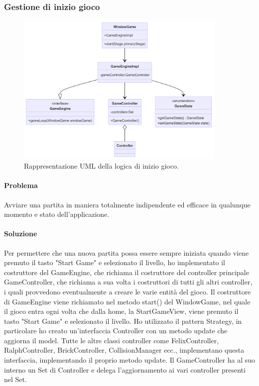 \documentclass[a4paper,12pt]{report}
\begin{document}
\subsubsection{Gestione di inizio gioco}

\begin{figure}[H]
\centering{}
\includegraphics[width=0.9\textwidth]{img/InizioGioco.png}
\caption{Rappresentazione UML della logica di inizio gioco.}
\end{figure}

\paragraph{Problema} Avviare una partita in maniera totalmente indipendente ed efficace in qualunque momento e stato dell’applicazione.

\paragraph{Soluzione} Per permettere che una nuova partita possa essere sempre iniziata quando viene premuto il tasto "Start Game" e selezionato il livello, ho implementato il costruttore del GameEngine, che richiama il costruttore del controller principale GameController, che richiama a sua volta i costruttori di tutti gli altri controller, i quali provvedono eventualmente a creare le varie entità del gioco. Il costruttore di GameEngine viene richiamato nel metodo start() del WindowGame, nel quale il gioco entra ogni volta che dalla home, la StartGameView, viene premuto il tasto "Start Game" e selezionato il livello. Ho utilizzato il pattern Strategy, in particolare ho creato un'interfaccia Controller con un metodo update che aggiorna il model. Tutte le altre classi controller come FelixController, RalphController, BrickController, CollisionManager ecc., implementano questa interfaccia, implementando il proprio metodo update. Il GameController ha al suo interno un Set di Controller e delega l'aggiornamento ai vari controller presenti nel Set. 
\end{document}

